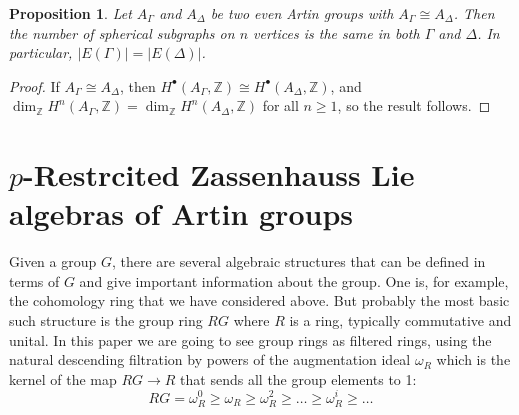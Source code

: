 \documentclass[10pt, oneside]{amsart}
\newcommand{\gr}{\operatorname{gr}} %
\newtheorem{proposition}[theorem]{Proposition}
\theoremstyle{definition}
\theoremstyle{remark}
\theoremstyle{plain}
\begin{document}
\begin{proposition}
Let $A_\Gamma$ and $A_\Delta$ be two even Artin groups with $A_\Gamma \cong A_\Delta$. Then the number of spherical subgraphs on $n$ vertices is the same in both $\Gamma$ and $\Delta$. In particular, $\lvert E(\Gamma)\rvert = \lvert E(\Delta)\rvert$.
\end{proposition}

\begin{proof}
If $A_\Gamma \cong A_\Delta$, then $H^\bullet(A_\Gamma,\mathbb{Z}) \cong H^\bullet(A_\Delta,\mathbb{Z})$, and $\dim_{\mathbb{Z}} H^n(A_\Gamma,\mathbb{Z}) = \dim_{\mathbb{Z}} H^n(A_\Delta,\mathbb{Z})$ for all $n \geq 1$, so the result follows.
\end{proof}
\section{\texorpdfstring{$p$}--Restrcited Zassenhauss Lie algebras of Artin groups}\label{sec:central}


Given a group $G$, there are several algebraic structures that can be defined in terms of $G$ and give important information about the group. One is, for example, the cohomology ring that we have considered above. But probably the most basic such structure is the group ring $RG$ where $R$ is a ring, typically commutative and unital. In this paper we are going to see group rings as filtered rings, using the natural descending filtration by powers of the augmentation ideal $\omega_R$ which is the kernel of the map $RG\to R$ that sends all the group elements to 1:
\begin{equation}\label{eq:filtRG}
    RG=\omega_R^0\geq\omega_R\geq\omega_R^2\geq\ldots\geq\omega_R^i\geq\ldots
\end{equation}



\end{document}
